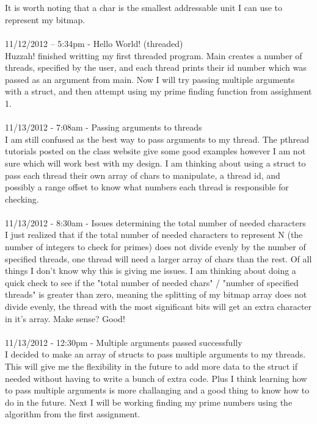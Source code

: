 \documentclass[12pt,letterpaper]{article}
\begin{document}
\\\\
It is worth noting that a char is the smallest addressable unit I can use to represent my bitmap. 
\\\\
11/12/2012 – 5:34pm - Hello World! (threaded)\\
Huzzah! finished writting my first threaded program. Main creates a number of threads, specified by the user, and each thread prints their id number which was passed as an argument from main. Now I will try passing multiple arguments with a struct, and then attempt using my prime finding function from assighment 1.
\\\\
11/13/2012 - 7:08am - Passing arguments to threads\\
I am still confused as the best way to pass arguments to my thread. The pthread tutorials posted on the class website give some good examples however I am not sure which will work best with my design. I am thinking about using a struct to pass each thread their own array of chars to manipulate, a thread id, and possibly a range offset to know what numbers each thread is responsible for checking.
\\\\
11/13/2012 - 8:30am - Issues determining the total number of needed characters\\
I just realized that if the total number of needed characters to represent N (the number of integers to check for primes) does not divide evenly by the number of specified threads, one thread will need a larger array of chars than the rest. Of all things I don't know why this is giving me issues. I am thinking about doing a quick check to see if the "total number of needed chars" / "number of specified threads" is greater than zero, meaning the splitting of my bitmap array does not divide evenly, the thread with the most significant bits will get an extra character in it's array. Make sense? Good!
\\\\
11/13/2012 - 12:30pm - Multiple arguments passed successfully\\
I decided to make an array of structs to pass multiple arguments to my threads. This will give me the flexibility in the future to add more data to the struct if needed without having to write a bunch of extra code. Plus I think learning how to pass multiple arguments is more challanging and a good thing to know how to do in the future. Next I will be working finding my prime numbers using the algorithm from the first assignment.
\end{document}
